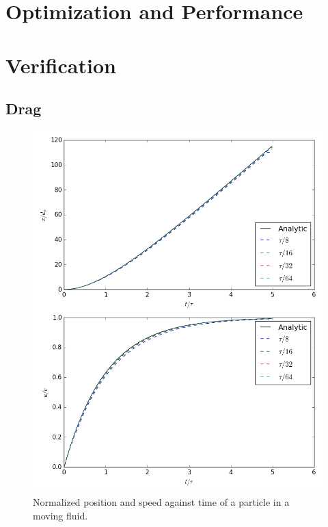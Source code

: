 \documentclass[10pt,a4paper,titlepage]{report}
\begin{document}
\section{Optimization and Performance}
\label{sec:Python verification}
\section{Verification}
\subsection{Drag}
\begin{figure}[!htb]
\centering
\includegraphics[scale=0.5]{figures/opencl_verification/drag_verification.png}
\caption{Normalized position and speed against time of a particle in a moving fluid.}
\label{fig:python_drag_verification}
\end{figure}
\end{document}
